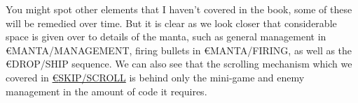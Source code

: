 You might spot other elements that I haven't covered in the book, some of these will be remedied over time. But it is clear as we look
closer that considerable space is given over to details of the manta, such as general management in \euro{MANTA/MANAGEMENT}, firing bullets
in \euro{MANTA/FIRING}, as well as the \euro{DROP/SHIP} sequence. We can also see that the scrolling mechanism which we covered in 
\hyperref[sec:scrolling]{\euro{SKIP/SCROLL}} is behind only the mini-game and enemy management in the amount of code it requires.


